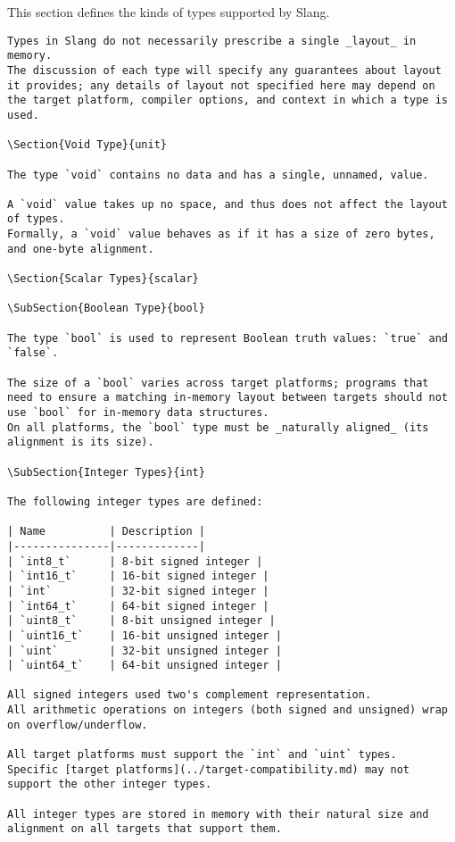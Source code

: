 
This section defines the kinds of types supported by Slang.

\begin{verbatim}
Types in Slang do not necessarily prescribe a single _layout_ in memory.
The discussion of each type will specify any guarantees about layout it provides; any details of layout not specified here may depend on the target platform, compiler options, and context in which a type is used.

\Section{Void Type}{unit}

The type `void` contains no data and has a single, unnamed, value.

A `void` value takes up no space, and thus does not affect the layout of types.
Formally, a `void` value behaves as if it has a size of zero bytes, and one-byte alignment.

\Section{Scalar Types}{scalar}

\SubSection{Boolean Type}{bool}

The type `bool` is used to represent Boolean truth values: `true` and `false`.

The size of a `bool` varies across target platforms; programs that need to ensure a matching in-memory layout between targets should not use `bool` for in-memory data structures.
On all platforms, the `bool` type must be _naturally aligned_ (its alignment is its size).

\SubSection{Integer Types}{int}

The following integer types are defined:

| Name          | Description |
|---------------|-------------|
| `int8_t`      | 8-bit signed integer |
| `int16_t`     | 16-bit signed integer |
| `int`         | 32-bit signed integer |
| `int64_t`     | 64-bit signed integer |
| `uint8_t`     | 8-bit unsigned integer |
| `uint16_t`    | 16-bit unsigned integer |
| `uint`        | 32-bit unsigned integer |
| `uint64_t`    | 64-bit unsigned integer |

All signed integers used two's complement representation.
All arithmetic operations on integers (both signed and unsigned) wrap on overflow/underflow.

All target platforms must support the `int` and `uint` types.
Specific [target platforms](../target-compatibility.md) may not support the other integer types.

All integer types are stored in memory with their natural size and alignment on all targets that support them.


\end{verbatim}
